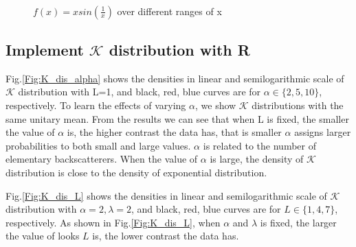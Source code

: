 \documentclass[conference,onecolumn]{IEEEtran}
\begin{document}
\begin{figure}[htbp]
	\centering
	\ 
	\
	\   
	\caption{$f(x)=xsin(\frac{1}{x})$ over different ranges of x }
	\label{Fig:sin1s}
\end{figure}


\subsection{Implement $\mathcal{K}$ distribution with R}

Fig.\ref{Fig:K_dis_alpha} shows the densities in linear and semilogarithmic scale of $\mathcal{K}$ distribution with L=1, and black, red, blue curves are for $\alpha\in\{2,5,10\}$, respectively. To learn the effects of varying $\alpha$, we show  $\mathcal{K}$ distributions with the same unitary mean. From the results we can see that when L is fixed, the smaller the value of $\alpha$ is, the higher contrast the data has, that is smaller $\alpha$ assigns larger probabilities to both small and large values. $\alpha$ is related to the number of elementary backscatterers. When the value of $\alpha$ is large, the density of $\mathcal{K}$ distribution is close to the density of exponential distribution.

Fig.\ref{Fig:K_dis_L} shows the densities in linear and semilogarithmic scale of $\mathcal{K}$ distribution with $\alpha=2, \lambda=2$, and black, red, blue curves are for $L\in\{1,4,7\}$, respectively. As shown in Fig.\ref{Fig:K_dis_L}, when $\alpha$ and $\lambda$ is fixed, the larger the value of looks $L$ is, the lower contrast the data has.
\end{document}
